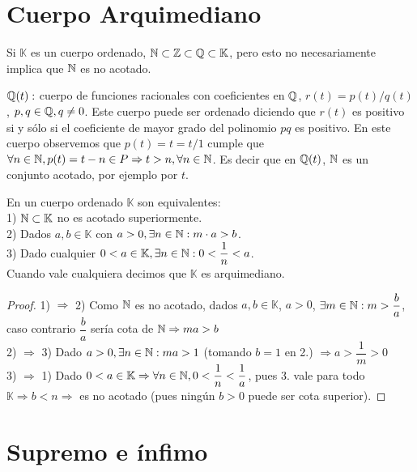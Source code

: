 \section{Cuerpo Arquimediano}

Si $\mathbb{K}$ es un cuerpo ordenado, $\mathbb{N} \subset \mathbb{Z} \subset \mathbb{Q} \subset \mathbb{K}$, pero esto no necesariamente implica que $\mathbb{N}$ es no acotado.

\begin{eg}
    $\mathbb{Q}(t):$ cuerpo de funciones racionales con coeficientes en $\mathbb{Q}$, $r(t) = p(t)/q(t)$, $p, q \in \mathbb{Q}, q \neq 0$. Este cuerpo puede ser ordenado diciendo que $r(t)$ es positivo si y sólo si el coeficiente de mayor grado del polinomio $pq$ es positivo.
    En este cuerpo observemos que $p(t)=t=t/1$ cumple que $\forall n \in \mathbb{N}, p(t)=t-n \in P \Rightarrow t>n, \forall n \in \mathbb{N}$. Es decir que en $\mathbb{Q}(t)$, $\mathbb{N}$ es un conjunto acotado, por ejemplo por $t$.
\end{eg}

\begin{theorem}
    En un cuerpo ordenado $\mathbb{K}$ son equivalentes: \\
    1) $\mathbb{N} \subset \mathbb{K}$ no es acotado superiormente. \\
    2) Dados $a, b \in \mathbb{K}$ con $a>0, \exists n \in \mathbb{N}:m \cdot a>b$. \\
    3) Dado cualquier $0<a \in \mathbb{K}, \exists n \in \mathbb{N} : 0 < \dfrac{1}{n} < a$. \\
    Cuando vale cualquiera decimos que $\mathbb{K}$ es arquimediano.
    \begin{proof}
        1) $\Rightarrow$ 2) Como $\mathbb{N}$ es no acotado, dados $a,b \in \mathbb{K}$, $a>0$, $\exists m \in \mathbb{N} : m > \dfrac ba$, caso contrario $\dfrac ba$ sería cota de $\mathbb{N} \Rightarrow ma>b$ \\
        2) $\Rightarrow$ 3) Dado $a>0, \exists n \in \mathbb{N} : ma>1$ (tomando $b=1$ en 2.) $\Rightarrow a>\dfrac 1m >0$ \\
        3) $\Rightarrow$ 1) Dado $0<a \in \mathbb{K} \Rightarrow \forall n \in \mathbb{N}, 0<\dfrac 1n<\dfrac 1a$, pues 3. vale para todo $\mathbb{K} \Rightarrow b<n \Rightarrow$ es no acotado (pues ningún $b>0$ puede ser cota superior).
    \end{proof}
\end{theorem}

\section{Supremo e ínfimo}

